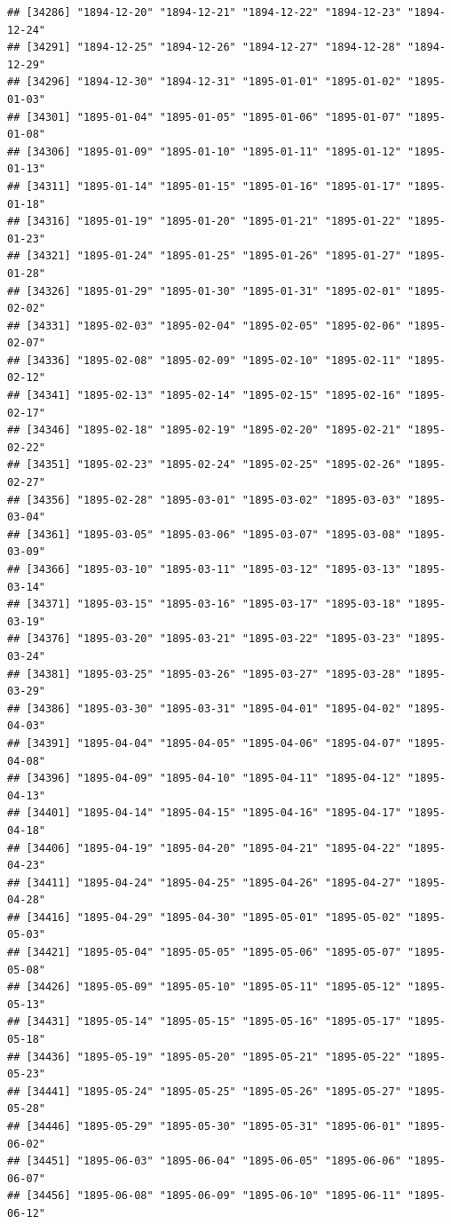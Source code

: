 \documentclass{article}\usepackage[]{graphicx}\usepackage[]{color}
\makeatletter
\newenvironment{kframe}{%
 \def\at@end@of@kframe{}%
 \ifinner\ifhmode%
  \def\at@end@of@kframe{\end{minipage}}%
  \begin{minipage}{\columnwidth}%
 \fi\fi%
 \def\FrameCommand##1{\hskip\@totalleftmargin \hskip-\fboxsep
 \colorbox{shadecolor}{##1}\hskip-\fboxsep
     \hskip-\linewidth \hskip-\@totalleftmargin \hskip\columnwidth}%
 \MakeFramed {\advance\hsize-\width
   \@totalleftmargin\z@ \linewidth\hsize
   \@setminipage}}%
 {\par\unskip\endMakeFramed%
 \at@end@of@kframe}
\newenvironment{knitrout}{}{} %
\makeatother
\begin{document}
\begin{description}
\begin{knitrout}
\begin{kframe}
\begin{verbatim}
## [34286] "1894-12-20" "1894-12-21" "1894-12-22" "1894-12-23" "1894-12-24"
## [34291] "1894-12-25" "1894-12-26" "1894-12-27" "1894-12-28" "1894-12-29"
## [34296] "1894-12-30" "1894-12-31" "1895-01-01" "1895-01-02" "1895-01-03"
## [34301] "1895-01-04" "1895-01-05" "1895-01-06" "1895-01-07" "1895-01-08"
## [34306] "1895-01-09" "1895-01-10" "1895-01-11" "1895-01-12" "1895-01-13"
## [34311] "1895-01-14" "1895-01-15" "1895-01-16" "1895-01-17" "1895-01-18"
## [34316] "1895-01-19" "1895-01-20" "1895-01-21" "1895-01-22" "1895-01-23"
## [34321] "1895-01-24" "1895-01-25" "1895-01-26" "1895-01-27" "1895-01-28"
## [34326] "1895-01-29" "1895-01-30" "1895-01-31" "1895-02-01" "1895-02-02"
## [34331] "1895-02-03" "1895-02-04" "1895-02-05" "1895-02-06" "1895-02-07"
## [34336] "1895-02-08" "1895-02-09" "1895-02-10" "1895-02-11" "1895-02-12"
## [34341] "1895-02-13" "1895-02-14" "1895-02-15" "1895-02-16" "1895-02-17"
## [34346] "1895-02-18" "1895-02-19" "1895-02-20" "1895-02-21" "1895-02-22"
## [34351] "1895-02-23" "1895-02-24" "1895-02-25" "1895-02-26" "1895-02-27"
## [34356] "1895-02-28" "1895-03-01" "1895-03-02" "1895-03-03" "1895-03-04"
## [34361] "1895-03-05" "1895-03-06" "1895-03-07" "1895-03-08" "1895-03-09"
## [34366] "1895-03-10" "1895-03-11" "1895-03-12" "1895-03-13" "1895-03-14"
## [34371] "1895-03-15" "1895-03-16" "1895-03-17" "1895-03-18" "1895-03-19"
## [34376] "1895-03-20" "1895-03-21" "1895-03-22" "1895-03-23" "1895-03-24"
## [34381] "1895-03-25" "1895-03-26" "1895-03-27" "1895-03-28" "1895-03-29"
## [34386] "1895-03-30" "1895-03-31" "1895-04-01" "1895-04-02" "1895-04-03"
## [34391] "1895-04-04" "1895-04-05" "1895-04-06" "1895-04-07" "1895-04-08"
## [34396] "1895-04-09" "1895-04-10" "1895-04-11" "1895-04-12" "1895-04-13"
## [34401] "1895-04-14" "1895-04-15" "1895-04-16" "1895-04-17" "1895-04-18"
## [34406] "1895-04-19" "1895-04-20" "1895-04-21" "1895-04-22" "1895-04-23"
## [34411] "1895-04-24" "1895-04-25" "1895-04-26" "1895-04-27" "1895-04-28"
## [34416] "1895-04-29" "1895-04-30" "1895-05-01" "1895-05-02" "1895-05-03"
## [34421] "1895-05-04" "1895-05-05" "1895-05-06" "1895-05-07" "1895-05-08"
## [34426] "1895-05-09" "1895-05-10" "1895-05-11" "1895-05-12" "1895-05-13"
## [34431] "1895-05-14" "1895-05-15" "1895-05-16" "1895-05-17" "1895-05-18"
## [34436] "1895-05-19" "1895-05-20" "1895-05-21" "1895-05-22" "1895-05-23"
## [34441] "1895-05-24" "1895-05-25" "1895-05-26" "1895-05-27" "1895-05-28"
## [34446] "1895-05-29" "1895-05-30" "1895-05-31" "1895-06-01" "1895-06-02"
## [34451] "1895-06-03" "1895-06-04" "1895-06-05" "1895-06-06" "1895-06-07"
## [34456] "1895-06-08" "1895-06-09" "1895-06-10" "1895-06-11" "1895-06-12"

\end{verbatim}
\end{kframe}
\end{knitrout}
\end{description}
\end{document}
